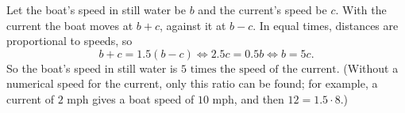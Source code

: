Let the boat's speed in still water be $b$ and the current's speed be $c$. With the current the boat moves at $b+c$, against it at $b-c$. In equal times, distances are proportional to speeds, so
\[
b+c=1.5(b-c)\iff 2.5c=0.5b\iff b=5c .
\]
So the boat's speed in still water is $\boxed{5\text{ times the speed of the current}}$. (Without a numerical speed for the current, only this ratio can be found; for example, a current of $2$ mph gives a boat speed of $10$ mph, and then $12=1.5\cdot8$.)

